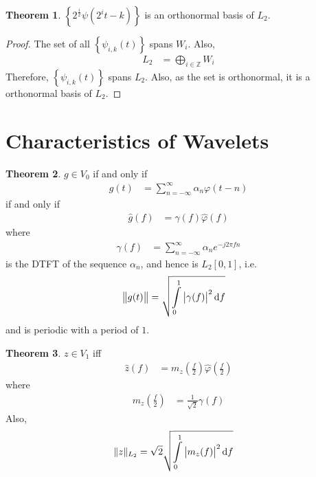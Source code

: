 \documentclass[titlepage, fleqn, a4paper, 12pt, twoside]{article}
\theoremstyle{definition}
\theoremstyle{theorem}
\newtheorem{theorem}{Theorem}
\begin{document}
\begin{theorem}
	$\left\{ 2^{\frac{i}{2}} \psi\left( 2^i t - k \right) \right\}$ is an orthonormal basis of $L_2$.
\end{theorem}

\begin{proof}
	The set of all $\left\{ \psi_{i,k}(t) \right\}$ spans $W_i$.
	Also,
	\begin{align*}
		L_2 &= \bigoplus_{i \in \mathbb{Z}} W_i
	\end{align*}
	Therefore, $\left\{ \psi_{i,k}(t) \right\}$ spans $L_2$.
	Also, as the set is orthonormal, it is a orthonormal basis of $L_2$.
\end{proof}

\section{Characteristics of Wavelets}

\begin{theorem}
	$g \in V_0$ if and only if
	\begin{align*}
		g(t) &= \sum\limits_{n = -\infty}^{\infty} \alpha_n \varphi(t - n)
	\end{align*}
	if and only if
	\begin{align*}
		\hat{g}(f) &= \gamma(f) \hat{\varphi}(f)
	\end{align*}
	where
	\begin{align*}
		\gamma(f) &= \sum\limits_{n = -\infty}^{\infty} \alpha_n e^{-j 2 \pi f n}
	\end{align*}
	is the DTFT of the sequence $\alpha_n$, and hence is $L_2[0,1]$, i.e.
	\begin{align*}
		\left\| g(t) \right\| &= \sqrt{\int\limits_{0}^{1} \left| \gamma(f) \right|^2 \dif f}
	\end{align*}
	and is periodic with a period of $1$.
\end{theorem}

\begin{theorem}
	$z \in V_1$ iff
	\begin{align*}
		\hat{z}(f) &= m_z\left( \frac{f}{2} \right) \hat{\varphi}\left( \frac{f}{2} \right)
	\end{align*}
	where
	\begin{align*}
		m_z\left( \frac{f}{2} \right) &= \frac{1}{\sqrt{2}} \gamma(f)
	\end{align*}
	Also,
	\begin{align*}
		\|z\|_{L_2} &= \sqrt{2} \sqrt{\int\limits_{0}^{1} \left| m_z(f) \right|^2 \dif f}
	\end{align*}
\end{theorem}
\end{document}
